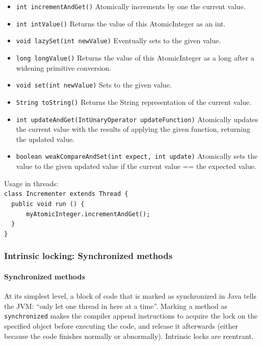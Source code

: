 \documentclass{article}
\begin{document}
\begin{itemize}
    \item \lstinline{int incrementAndGet()} Atomically increments by one the current value.
    \item \lstinline{int intValue()} Returns the value of this AtomicInteger as an int.
    \item \lstinline{void lazySet(int newValue)} Eventually sets to the given value.
    \item \lstinline{long longValue()} Returns the value of this AtomicInteger as a long after a widening primitive conversion.
    \item \lstinline{void set(int newValue)} Sets to the given value.
    \item \lstinline{String toString()} Returns the String representation of the current value.
    \item \lstinline{int updateAndGet(IntUnaryOperator updateFunction)} Atomically updates the current value with the results of applying the given function, returning the updated value.
    \item \lstinline{boolean weakCompareAndSet(int expect, int update)} Atomically sets the value to the given updated value if the current value == the expected value.
\end{itemize}
Usage in threads:\\
    \lstinline|class Incrementer extends Thread {|\\
    \lstinline|  public void run () {|\\
    \lstinline|      myAtomicInteger.incrementAndGet();|\\
    \lstinline|  }|\\
    \lstinline|}|

\subsubsection{Intrinsic locking: Synchronized methods}
\paragraph {Synchronized methods} At its simplest level, a block of code that is marked as synchronized in Java tells the JVM: ``only let one thread in here at a time''. Marking a method as \lstinline{synchronized} makes the compiler append instructions to acquire the lock on the specified object before executing the code, and release it afterwards (either because the code finishes normally or abnormally). Intrinsic locks are reentrant.
\end{document}
